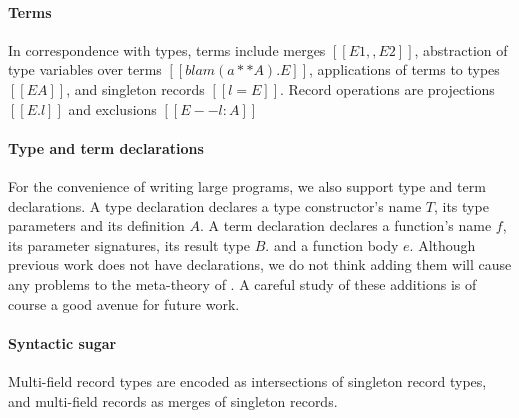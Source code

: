 \paragraph{Terms}

In correspondence with types, terms include merges $[[E1 ,, E2]]$, abstraction
of type variables over terms $[[blam ( a ** A ) . E]]$, applications of terms to
types $[[E A]]$, and singleton records $[[ { l = E } ]]$. Record operations are
projections $[[E.l]]$ and exclusions $[[E -- { l : A }]]$

\paragraph{Type and term declarations}

For the convenience of writing large programs, we also support type and term
declarations. A type declaration declares a type constructor's name $T$, its
type parameters and its definition $A$. A term declaration declares a function's
name $f$, its parameter signatures, its result type $B$. and a function body
$e$. Although previous work does not have declarations, we do not think adding
them will cause any problems to the meta-theory of \bname. A careful study of
these additions is of course a good avenue for future work.

\paragraph{Syntactic sugar} Multi-field record types are encoded as
intersections of singleton record types, and multi-field records as merges of
singleton records.


